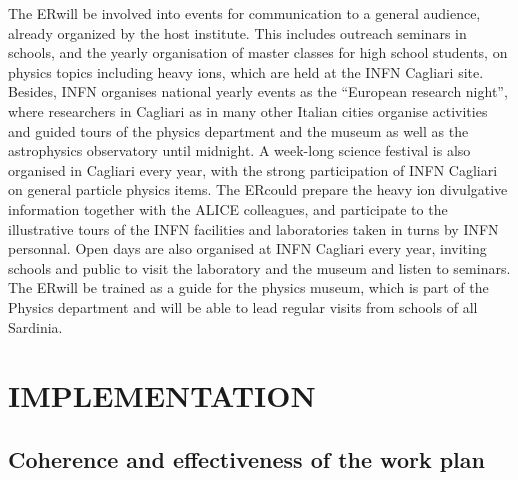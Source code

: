 \documentclass[a4paper,11pt]{article}
\newcommand{\ER}{ER}
\begin{document}
The \ER will be involved into events for communication to a general
audience, already organized by the host institute. This includes
outreach seminars in schools, and the yearly organisation of master
classes for high school students, on physics topics including heavy
ions, which are held at the INFN Cagliari site.  Besides, INFN organises 
national yearly events as the ``European research night'', where researchers
in Cagliari as in many other Italian cities organise activities and guided tours of the 
physics department and the museum as well as the 
astrophysics observatory until midnight.
A week-long science festival is also organised in Cagliari every year, 
with the strong participation of INFN Cagliari on general particle physics 
items. The \ER could prepare the heavy ion divulgative information together with the 
ALICE colleagues, and participate to the illustrative tours of the INFN
facilities and laboratories taken in turns 
by INFN personnal. 
Open days are also organised at INFN Cagliari every year, inviting schools and
public to visit the laboratory and the museum and listen to seminars.
The \ER will be trained as a guide for the physics museum, which 
is part of the Physics department and will be able to lead regular 
visits from schools of all Sardinia.
%        

\section{IMPLEMENTATION}
\label{sec:implementation}

%            
           
\subsection{Coherence and effectiveness of the work plan}
\end{document}
